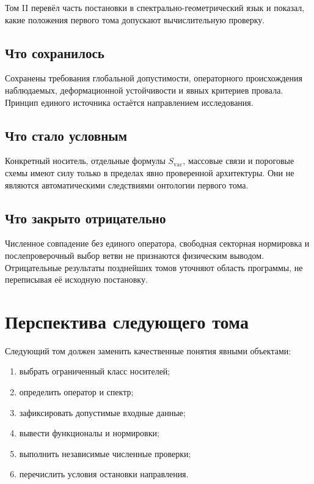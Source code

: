 Том II перевёл часть постановки в спектрально-геометрический язык и показал,
какие положения первого тома допускают вычислительную проверку.

\section{Что сохранилось}

Сохранены требования глобальной допустимости, операторного происхождения
наблюдаемых, деформационной устойчивости и явных критериев провала. Принцип
единого источника остаётся направлением исследования.

\section{Что стало условным}

Конкретный носитель, отдельные формулы $S_{\mathrm{vac}}$, массовые связи и
пороговые схемы имеют силу только в пределах явно проверенной архитектуры.
Они не являются автоматическими следствиями онтологии первого тома.

\section{Что закрыто отрицательно}

Численное совпадение без единого оператора, свободная секторная нормировка и
послепроверочный выбор ветви не признаются физическим выводом. Отрицательные
результаты позднейших томов уточняют область программы, не переписывая её
исходную постановку.

\chapter{Перспектива следующего тома}

Следующий том должен заменить качественные понятия явными объектами:
\begin{enumerate}
 \item выбрать ограниченный класс носителей;
 \item определить оператор и спектр;
 \item зафиксировать допустимые входные данные;
 \item вывести функционалы и нормировки;
 \item выполнить независимые численные проверки;
 \item перечислить условия остановки направления.
\end{enumerate}

